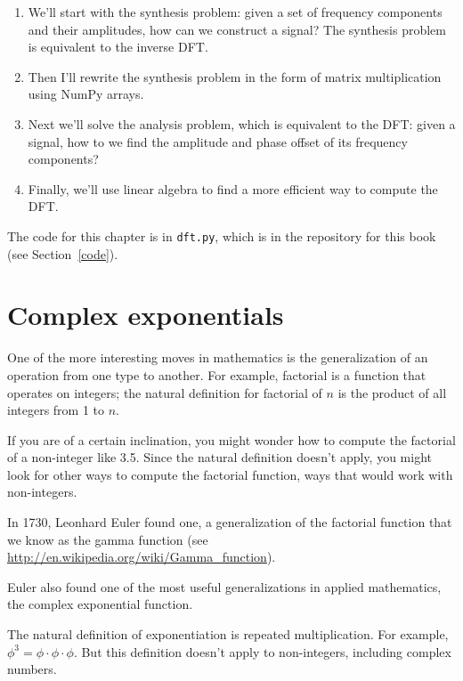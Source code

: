\documentclass[12pt]{book}
\begin{document}
\begin{enumerate}

\item We'll start with the synthesis
  problem: given a set of frequency components and their amplitudes,
  how can we construct a signal?  The synthesis problem is 
  equivalent to the inverse DFT.

\item Then I'll rewrite the synthesis problem in the form of matrix
  multiplication using NumPy arrays.

\item Next we'll solve the analysis problem, which is equivalent to
  the DFT: given a signal, how to we find the amplitude and phase
  offset of its frequency components?

\item Finally, we'll use linear algebra to find a more efficient way
  to compute the DFT.

\end{enumerate}

The code for this chapter is in {\tt dft.py}, which is in the
repository for this book (see Section~\ref{code}).


\section{Complex exponentials}

One of the more interesting moves in mathematics is the generalization
of an operation from one type to another.  For example, factorial is a
function that operates on integers; the natural definition for
factorial of $n$ is the product of all integers from 1 to $n$.

If you are of a certain inclination, you might wonder how to compute
the factorial of a non-integer like 3.5.  Since the natural definition
doesn't apply, you might look for other ways to compute the factorial
function, ways that would work with non-integers.

In 1730, Leonhard Euler found one, a generalization of the factorial
function that we know as the gamma function (see
\url{http://en.wikipedia.org/wiki/Gamma_function}).

Euler also found one of the most useful generalizations in applied
mathematics, the complex exponential function.

The natural definition of exponentiation is repeated multiplication.
For example, $\phi^3 = \phi \cdot \phi \cdot \phi$.  But this
definition doesn't apply to non-integers, including complex numbers.
\end{document}
